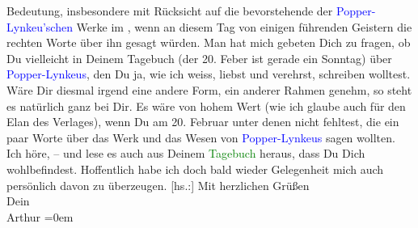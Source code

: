                Bedeutung, insbesondere mit Rücksicht auf die bevorstehende \label{K_L02360_2v}\label{K_L02360_2h} der \textcolor{blue}{Popper-Lynkeu’schen}{}\ledrightnote{\textcolor{blue}{Josef Popper-Lynkeus}} Werke
               im \label{K_L02360_3v}\label{K_L02360_3h}, wenn an diesem Tag
               von einigen führenden Geistern die rechten Worte über ihn gesagt würden. Man hat mich
               gebeten Dich zu fragen, ob Du vielleicht in Deinem Tagebuch (der 20.
                  Feber ist gerade ein Sonntag) über \textcolor{blue}{Popper-Lynkeus}{}\ledrightnote{\textcolor{blue}{Josef Popper-Lynkeus}}, den Du ja, wie ich weiss, liebst und verehrst, schreiben
               wolltest. Wäre Dir diesmal irgend eine andere Form, ein anderer Rahmen genehm, so
               steht es natürlich ganz bei Dir. Es wäre von hohem Wert (wie ich glaube auch für den
               Elan des Verlages), wenn Du am 20. Februar unter denen nicht fehltest,
               die ein paar Worte über das Werk und das Wesen von \textcolor{blue}{Popper-Lynkeus}{}\ledrightnote{\textcolor{blue}{Josef Popper-Lynkeus}} sagen wollten.\pend
           \pstart
           Ich höre\introOben{}, –\introOben{} und lese es auch aus Deinem \textcolor{green}{Tagebuch}{}\ledrightnote{\textcolor{green}{Tagebuch [Kolumne im Neuen Wiener Journal]}} heraus, dass Du Dich wohlbefindest. Hoffentlich habe ich
               doch bald wieder Gelegenheit mich auch persönlich davon zu überzeugen.\pend
           \pstart
           {[}hs.:{]} Mit herzlichen Grüßen{\\[\baselineskip]}Dein{\\[\baselineskip]}\spacefill\mbox{Arthur}\pend
           \leftskip=0em{}\endnumbering{}  
      